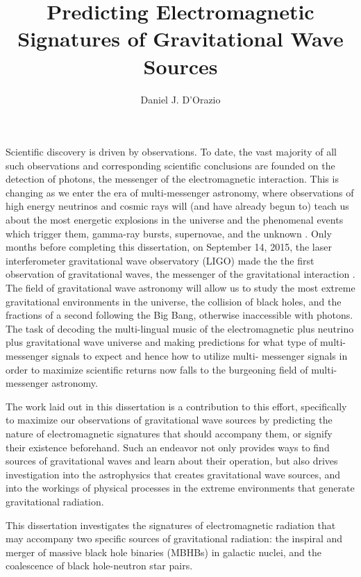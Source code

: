 \documentclass[12pt,letterpaper]{article}
\begin{document}
\title{Predicting Electromagnetic Signatures of Gravitational Wave Sources}
\author{Daniel J. D'Orazio}
\date{}
\maketitle


Scientific discovery is driven by observations. To date, the vast majority of
all such observations and corresponding scientific conclusions are founded on
the detection of photons, the messenger of the electromagnetic interaction.
This is changing as we enter the era of multi-messenger astronomy, where
observations of high energy neutrinos and cosmic rays will (and have already
begun to) teach us about the most energetic explosions in the universe and the
phenomenal events which trigger them, gamma-ray bursts, supernovae, and the
unknown \citep[\textit{e.g.}][]{Hirata:1987, Bionta:1987, ICECUBE:2013:detection}. 
Only months before completing this dissertation, on
September 14, 2015, the laser interferometer gravitational wave observatory
(LIGO) made the the first observation of gravitational waves, the messenger of
the gravitational interaction \citep{GW150914:2016}. The field of
gravitational wave astronomy will allow us to study the most extreme
gravitational environments in the universe, the collision of black holes, and
the fractions of a second following the Big Bang, otherwise inaccessible with
photons. The task of decoding the multi-lingual music of the electromagnetic
plus neutrino plus gravitational wave universe and making predictions for what
type of multi-messenger signals to expect and hence how to utilize multi-
messenger signals in order to maximize scientific returns now falls to the
burgeoning field of multi-messenger astronomy.

The work laid out in this dissertation is a contribution to this effort,
specifically to maximize our observations of gravitational wave sources by
predicting the nature of electromagnetic signatures that should accompany
them, or signify their existence beforehand. Such an endeavor not only
provides ways to find sources of gravitational waves and learn about their
operation, but also drives investigation into the astrophysics that creates
gravitational wave sources, and into the workings of physical processes in the
extreme environments that generate gravitational radiation.



This dissertation investigates the signatures of electromagnetic radiation
that may accompany two specific sources of gravitational radiation: the
inspiral and merger of massive black hole binaries (MBHBs) in galactic nuclei,
and the coalescence of black hole-neutron star pairs.
\end{document}
